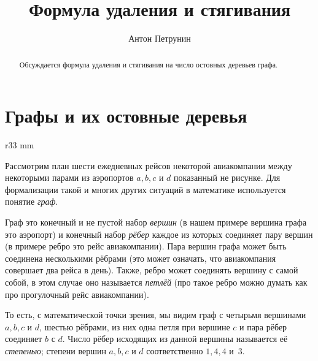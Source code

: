 \documentclass{article}
\begin{document}
\title{Формула удаления и стягивания}
\author{Антон Петрунин}
\date{}
\maketitle

\begin{abstract}
Обсуждается формула удаления и стягивания на число остовных деревьев графа.
\end{abstract}



\section{Графы и их остовные деревья}

\begin{wrapfigure}{r}{33 mm}
\end{wrapfigure}

Рассмотрим план шести ежедневных рейсов некоторой авиакомпании между некоторыми парами из аэропортов $a,b,c$ и $d$
показанный не рисунке.
Для формализации такой и многих других ситуаций в математике используется понятие \emph{граф}.

Граф это конечный и не пустой набор \emph{вершин} (в нашем примере вершина графа это аэропорт) 
и конечный набор \emph{рёбер} каждое из которых соединяет пару вершин (в примере ребро это рейс авиакомпании).
Пара вершин графа может быть соединена несколькими рёбрами (это может означать, что авиакомпания совершает два рейса в день). 
Также, ребро может соединять вершину с самой собой, в этом случае оно называется \emph{петлёй} (про такое ребро можно думать как про прогулочный рейс авиакомпании).

То есть, с математической точки зрения, мы видим граф с четырьмя вершинами $a,b,c$ и $d$, 
шестью рёбрами, из них
одна петля при вершине $c$ и пара рёбер соединяет $b$ с $d$.
Число рёбер исходящих из данной вершины называется её \emph{степенью};
степени вершин $a,b,c$ и $d$ соответственно $1,4,4$ и~$3$.
\end{document}
